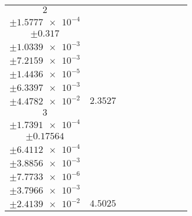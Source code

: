 \documentclass[8pt]{article}
\begin{document}
\begin{longtable}[l]{c c c c c c c c c}
$\num{2}$ & \begin{tabular}[c]{@{}c@{}}$\num{2.8997e-2}$ \\ $\pm\num{1.5777e-4}$\end{tabular} & \begin{tabular}[c]{@{}c@{}}$\num{-8.2623e-2}$ \\ $\pm\num{0.317}$\end{tabular} & \begin{tabular}[c]{@{}c@{}}$\num{-6.9247}$ \\ $\pm\num{1.0339e-3}$\end{tabular} & \begin{tabular}[c]{@{}c@{}}$\num{3.5405e+3}$ \\ $\pm\num{7.2159e-3}$\end{tabular} & \begin{tabular}[c]{@{}c@{}}$\num{7.083}$ \\ $\pm\num{1.4436e-5}$\end{tabular} & \begin{tabular}[c]{@{}c@{}}$\num{1.1434}$ \\ $\pm\num{6.3397e-3}$\end{tabular} & \begin{tabular}[c]{@{}c@{}}$\num{4.2716}$ \\ $\pm\num{4.4782e-2}$\end{tabular} & $\num{2.3527}$\\
$\num{3}$ & \begin{tabular}[c]{@{}c@{}}$\num{5.858e-2}$ \\ $\pm\num{1.7391e-4}$\end{tabular} & \begin{tabular}[c]{@{}c@{}}$\num{0.62718}$ \\ $\pm\num{0.17564}$\end{tabular} & \begin{tabular}[c]{@{}c@{}}$\num{-0.49465}$ \\ $\pm\num{6.4112e-4}$\end{tabular} & \begin{tabular}[c]{@{}c@{}}$\num{3.5469e+3}$ \\ $\pm\num{3.8856e-3}$\end{tabular} & \begin{tabular}[c]{@{}c@{}}$\num{7.0958}$ \\ $\pm\num{7.7733e-6}$\end{tabular} & \begin{tabular}[c]{@{}c@{}}$\num{1.3132}$ \\ $\pm\num{3.7966e-3}$\end{tabular} & \begin{tabular}[c]{@{}c@{}}$\num{4.2685}$ \\ $\pm\num{2.4139e-2}$\end{tabular} & $\num{4.5025}$\\

\end{longtable}
\end{document}
